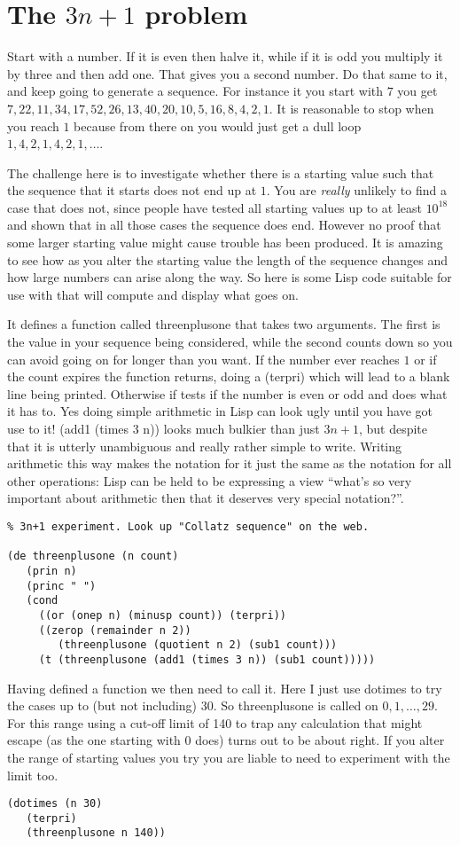 \section{The $3n+1$ problem}
Start with a number. If it is even then halve it, while if it is odd
you multiply it by three and then add one. That gives you a second number.
Do that same to it, and keep going to generate a sequence. For instance it
you start with $7$ you get $7, 22, 11, 34, 17, 52, 26, 13, 40, 20, 10, 5,
16, 8, 4, 2, 1$. It is reasonable to stop when you reach $1$ because
from there on you would just get a dull loop $1, 4, 2, 1, 4, 2, 1,\ldots$.

The challenge here is to investigate whether there is a starting value
such that the sequence that it starts does not end up at $1$. You are
{\em really} unlikely to find a case that does not, since people have
tested all starting values up to at least $10^{18}$ and shown that in
all those cases the sequence does end. However no proof that some larger
starting value might cause trouble has been produced. It is amazing to see
how as you alter the starting value the length of the sequence changes and
how large numbers can arise along the way. So here is some Lisp
code suitable for use with \vsl{} that will compute and display
what goes on.

It defines a function called {\tx threenplusone} that takes two
arguments. The first is the value in your sequence being considered, while
the second counts down so you can avoid going on for longer than you want.
If the number ever reaches $1$ or if the count expires the function returns,
doing a {\tx (terpri)} which will lead to a blank line being printed.
Otherwise if tests if the number is even or odd and does what it has to.
Yes doing simple arithmetic in Lisp can look ugly until you have got
use to it! {\tx (add1 (times 3 n))} looks much bulkier than
just $3n+1$, but despite that it is utterly unambiguous and really rather
simple to write. Writing arithmetic this way makes the notation for it
just the same as the notation for all other operations: Lisp can be held
to be expressing a view ``what's so very important about arithmetic then
that it deserves very special notation?''.
{\small\begin{verbatim}
% 3n+1 experiment. Look up "Collatz sequence" on the web.

(de threenplusone (n count)
   (prin n)
   (princ " ")
   (cond
     ((or (onep n) (minusp count)) (terpri))
     ((zerop (remainder n 2))
        (threenplusone (quotient n 2) (sub1 count)))
     (t (threenplusone (add1 (times 3 n)) (sub1 count)))))
\end{verbatim}}
\noindent Having defined a function we then need to call it. Here I just
use {\tx dotimes} to try the cases up to (but not including) 30. So
{\tx threenplusone} is called on $0, 1,\ldots , 29$. For this range
using a cut-off limit of 140 to trap any calculation that might escape (as
the one starting with $0$ does) turns out to be about right. If you alter
the range of starting values you try you are liable to need to experiment
with the limit too.
{\small\begin{verbatim}
(dotimes (n 30)
   (terpri)
   (threenplusone n 140))
\end{verbatim}}


